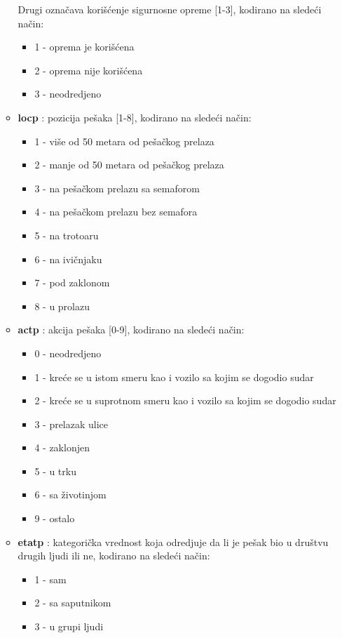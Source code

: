 \documentclass[a4paper,10pt]{article}
\begin{document}
\begin{itemize}
\begin{itemize}
	Drugi označava korišćenje sigurnosne opreme [1-3], kodirano na sledeći način:
	\begin{itemize}
	 \item 1 - oprema je korišćena
	 \item 2 - oprema nije korišćena
	 \item 3 - neodredjeno
	\end{itemize}

  \item \textbf{locp} : pozicija pešaka [1-8], kodirano na sledeći način:
	\begin{itemize}
	 \item 1 - više od 50 metara od pešačkog prelaza
	 \item 2 - manje od 50 metara od pešačkog prelaza
	 \item 3 - na pešačkom prelazu sa semaforom
	 \item 4 - na pešačkom prelazu bez semafora
	 \item 5 - na trotoaru
	 \item 6 - na ivičnjaku
	 \item 7 - pod zaklonom
	 \item 8 - u prolazu
	\end{itemize}

  \item \textbf{actp} : akcija pešaka [0-9], kodirano na sledeći način:
	\begin{itemize}
	 \item 0 - neodredjeno
	 \item 1 - kreće se u istom smeru kao i vozilo sa kojim se dogodio sudar
	 \item 2 - kreće se u suprotnom smeru kao i vozilo sa kojim se dogodio sudar
	 \item 3 - prelazak ulice
	 \item 4 - zaklonjen
	 \item 5 - u trku
	 \item 6 - sa životinjom
	 \item 9 - ostalo
	\end{itemize}

  \item \textbf{etatp} : kategorička vrednost koja odredjuje da li je pešak bio u društvu drugih ljudi ili ne, kodirano na sledeći način:
	\begin{itemize}
	 \item 1 - sam
	 \item 2 - sa saputnikom
	 \item 3 - u grupi ljudi
	\end{itemize}


\end{itemize}
\end{itemize}
\end{document}
